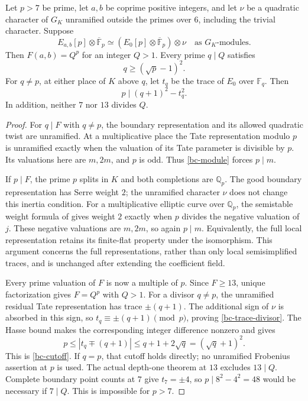 \begin{theorem}\label{bc-pure}
Let $p>7$ be prime, let $a,b$ be coprime positive integers, and let
$\nu$ be a quadratic character of $G_K$ unramified outside the primes
over $6$, including the trivial character. Suppose
\begin{equation}\label{bc-module}
 E_{a,b}[p]\otimes\overline{\mathbb F}_p
 \simeq (E_0[p]\otimes\overline{\mathbb F}_p)\otimes\nu
 \quad\text{as }G_K\text{-modules}.
\end{equation}
Then $F(a,b)=Q^p$ for an integer $Q>1$. Every prime $q\mid Q$ satisfies
\begin{equation}\label{bc-cutoff}
 q\ge(\sqrt p-1)^2.
\end{equation}
For $q\ne p$, at either place of $K$ above $q$, let $t_q$ be the
trace of $E_0$ over $\mathbb F_q$. Then
\begin{equation}\label{bc-trace-divisor}
 p\mid(q+1)^2-t_q^2.
\end{equation}
In addition, neither $7$ nor $13$ divides $Q$.
\end{theorem}
\begin{proof}
For $q\mid F$ with $q\ne p$, the boundary representation and its
allowed quadratic twist are unramified. At a multiplicative place the
Tate representation modulo $p$ is unramified exactly when the valuation
of its Tate parameter is divisible by $p$. Its valuations here are
$m,2m$, and $p$ is odd. Thus \eqref{bc-module} forces $p\mid m$.

If $p\mid F$, the prime $p$ splits in $K$ and both completions are
$\mathbb Q_p$. The good boundary representation has Serre weight $2$;
the unramified character $\nu$ does not change this inertia condition.
For a multiplicative elliptic curve over $\mathbb Q_p$, the semistable
weight formula of \cite[\S2.9, Proposition~5]{Serre1987Modular} gives
weight $2$ exactly when $p$ divides the negative valuation of $j$.
These negative valuations are $m,2m$, so again $p\mid m$.
Equivalently, the full local representation retains its finite-flat
property under the isomorphism. This argument concerns the full
representations, rather than only local semisimplified traces, and is
unchanged after extending the coefficient field.

Every prime valuation of $F$ is now a multiple of $p$. Since $F\ge13$,
unique factorization gives $F=Q^p$ with $Q>1$.
For a divisor $q\ne p$, the unramified residual Tate representation
has trace $\pm(q+1)$. The additional sign of $\nu$ is absorbed in
this sign, so $t_q\equiv\pm(q+1)\pmod p$, proving
\eqref{bc-trace-divisor}. The Hasse bound makes the corresponding
integer difference nonzero and gives
\[
 p\le |t_q\mp(q+1)|\le q+1+2\sqrt q=(\sqrt q+1)^2.
\]
This is \eqref{bc-cutoff}. If $q=p$, that cutoff holds directly;
no unramified Frobenius assertion at $p$ is used.
The actual depth-one theorem at $13$ excludes $13\mid Q$.
Complete boundary point counts at $7$ give $t_7=\pm4$, so
$p\mid 8^2-4^2=48$ would be necessary if $7\mid Q$. This is
impossible for $p>7$.
\end{proof}

